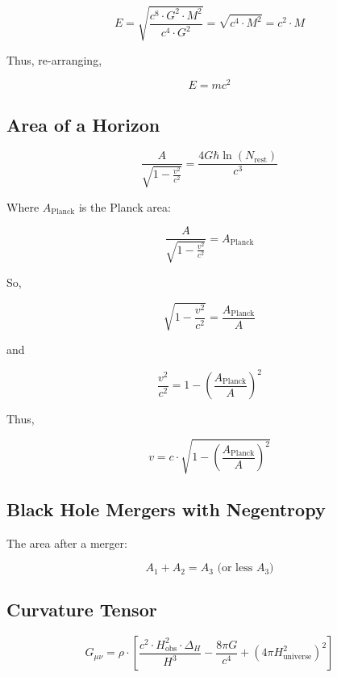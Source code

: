 \documentclass[a4paper, 11pt]{article}
\begin{document}
\begin{equation}
E = \sqrt{\frac{c^8 \cdot G^2 \cdot M^2}{c^4 \cdot G^2}} = \sqrt{c^4 \cdot M^2} = c^2 \cdot M
\end{equation}

Thus, re-arranging,

\begin{equation}
E = mc^2
\end{equation}

\subsection{Area of a Horizon}
\begin{equation}
\frac{A}{\sqrt{1 - \frac{v^2}{c^2}}} = \frac{4G\hbar \ln(N_{\text{rest}})}{c^3}
\end{equation}

Where \( A_{\text{Planck}} \) is the Planck area:

\begin{equation}
\frac{A}{\sqrt{1 - \frac{v^2}{c^2}}} = A_{\text{Planck}}
\end{equation}

So,

\begin{equation}
\sqrt{1 - \frac{v^2}{c^2}} = \frac{A_{\text{Planck}}}{A}
\end{equation}

and

\begin{equation}
\frac{v^2}{c^2} = 1 - \left(\frac{A_{\text{Planck}}}{A}\right)^2
\end{equation}

Thus,

\begin{equation}
v = c \cdot \sqrt{1 - \left(\frac{A_{\text{Planck}}}{A}\right)^2}
\end{equation}

\subsection{Black Hole Mergers with Negentropy}

The area after a merger:

\begin{equation}
A_1 + A_2 = A_3 \text{ (or less } A_3)
\end{equation}

\subsection{Curvature Tensor}
\begin{equation}
G_{\mu\nu} = \rho \cdot \left[ \frac{c^2 \cdot H_{\text{obs}}^2 \cdot \Delta_H}{H^3} - \frac{8 \pi G}{c^4} + \left(4 \pi H_{\text{universe}}^2\right)^2 \right]
\end{equation}
\end{document}
